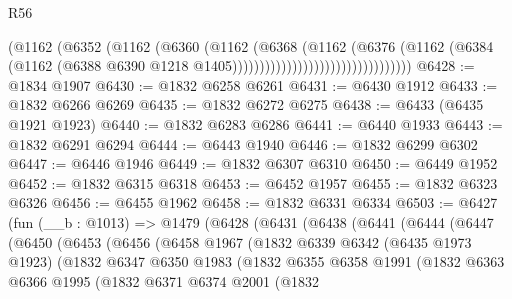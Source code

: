 \begin{lexlean}{R56}
\begin{coremodule}
                                              (@1162
                                                (@6352
                                                  (@1162
                                                    (@6360
                                                      (@1162
                                                        (@6368
                                                          (@1162
                                                            (@6376
                                                              (@1162
                                                                (@6384
                                                                  (@1162
                                                                    (@6388
                                                                      @6390
                                                                      @1218
                                                                      @1405)))))))))))))))))))))))))))))))))
@6428 := @1834 @1907
@6430 := @1832 @6258 @6261
@6431 := @6430 @1912
@6433 := @1832 @6266 @6269
@6435 := @1832 @6272 @6275
@6438 := @6433 (@6435 @1921 @1923)
@6440 := @1832 @6283 @6286
@6441 := @6440 @1933
@6443 := @1832 @6291 @6294
@6444 := @6443 @1940
@6446 := @1832 @6299 @6302
@6447 := @6446 @1946
@6449 := @1832 @6307 @6310
@6450 := @6449 @1952
@6452 := @1832 @6315 @6318
@6453 := @6452 @1957
@6455 := @1832 @6323 @6326
@6456 := @6455 @1962
@6458 := @1832 @6331 @6334
@6503 := @6427
    (fun (__b : @1013) =>
    @1479
      (@6428
        (@6431
          (@6438
            (@6441
              (@6444
                (@6447
                  (@6450
                    (@6453
                      (@6456
                        (@6458
                          @1967
                          (@1832
                            @6339
                            @6342
                            (@6435 @1973 @1923)
                            (@1832
                              @6347
                              @6350
                              @1983
                              (@1832
                                @6355
                                @6358
                                @1991
                                (@1832
                                  @6363
                                  @6366
                                  @1995
                                  (@1832
                                    @6371
                                    @6374
                                    @2001
                                    (@1832

\end{coremodule}
\end{lexlean}

